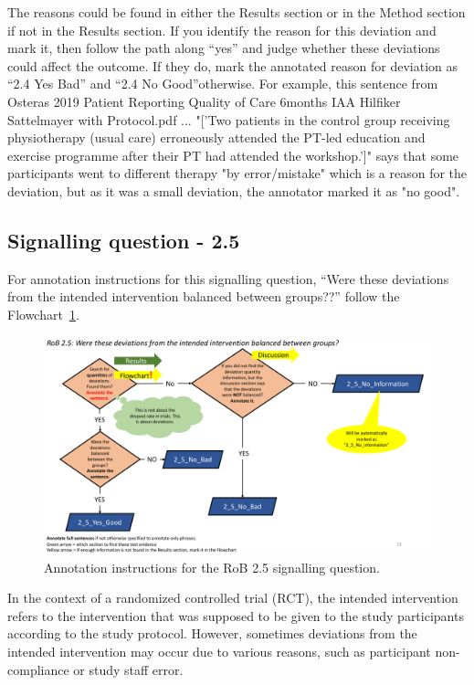 \documentclass[sn-mathphys,Numbered]{sn-jnl}%
\begin{document}
The reasons could be found in either the Results section or in the Method section if not in the Results section.
If you identify the reason for this deviation and mark it, then follow the path along ``yes'' and judge whether these deviations could affect the outcome.
If they do, mark the annotated reason for deviation as ``2.4 Yes Bad'' and ``2.4 No Good''otherwise.
For example, this sentence from Osteras 2019 Patient Reporting Quality of Care 6months IAA Hilfiker Sattelmayer with Protocol.pdf ... "['Two patients in the control group receiving physiotherapy (usual care) erroneously attended the PT-led education and exercise programme after their PT had attended the workshop.']" says that some participants went to different therapy "by error/mistake" which is a reason for the deviation, but as it was a small deviation, the annotator marked it as "no good".
%
%
%
\subsection*{Signalling question - 2.5 }
%
For annotation instructions for this signalling question, ``Were these deviations from the intended intervention balanced between groups??'' follow the Flowchart~\ref{fig:2_5}.
%
\begin{figure}[hbt]
    \centering
    \includegraphics[width=\textwidth]{figures/2_5.pdf}
    \caption{Annotation instructions for the RoB 2.5 signalling question.}
    \label{fig:2_5}
\end{figure}
%
In the context of a randomized controlled trial (RCT), the intended intervention refers to the intervention that was supposed to be given to the study participants according to the study protocol. However, sometimes deviations from the intended intervention may occur due to various reasons, such as participant non-compliance or study staff error.
\end{document}
